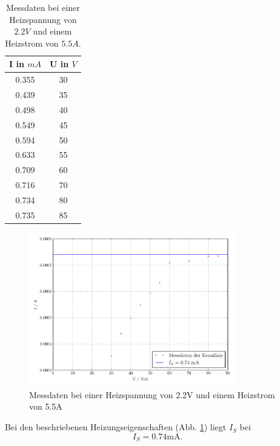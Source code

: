 \begin{table}
 \centering
 \caption{Messdaten bei einer Heizspannung von $2.2V$ und einem Heizstrom von $5.5A$.}
 \label{tab:daten2}
 \begin{tabular}{|c c|}  
 \toprule
I in $mA$ & U in $V$\\
\midrule
0.355 & 30\\
0.439 & 35\\
0.498 & 40\\
0.549 & 45\\
0.594 & 50\\
0.633 & 55\\
0.709 & 60\\
0.716 & 70\\
0.734 & 80\\
0.735 & 85\\
\bottomrule
\end{tabular}
\end{table}


\begin{figure}[H]
  \centering
  \includegraphics[width=0.8\textwidth]{build/Kennlinie2.pdf}
  \caption{Messdaten bei einer Heizspannung von 2.2V und einem Heizstrom von 5.5A \cite{sample}}
  \label{fig:kenn2}
\end{figure}
Bei den beschriebenen Heizungseigenschaften (Abb. \ref{fig:kenn2}) liegt $I_S$ bei 
\begin{equation}
I_S = 0.74 \mathrm{mA}.
\label{eq:kenn2ergebnis}
\end{equation}

